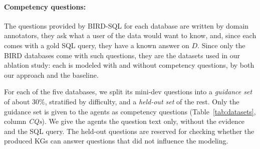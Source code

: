 \paragraph{Competency questions:}
The questions provided by BIRD-SQL for each database are written by domain annotators, they ask what a user of the data would want to know, and, since each comes with a gold SQL query, they have a known answer on \(D\). Since only the BIRD databases come with such questions, they are the datasets used in our ablation study: each is modeled with and without competency questions, by both our approach and the baseline. 

For each of the five databases, we split its mini-dev questions into a \emph{guidance set} of about 30\%, stratified by difficulty, and a \emph{held-out set} of the rest. Only the guidance set is given to the agents as competency questions (Table~\ref{tab:datasets}, column \emph{CQs}). We give the agents the question text only, without the evidence and the SQL query. The held-out questions are reserved for checking whether the produced KGs can answer questions that did not influence the modeling.


